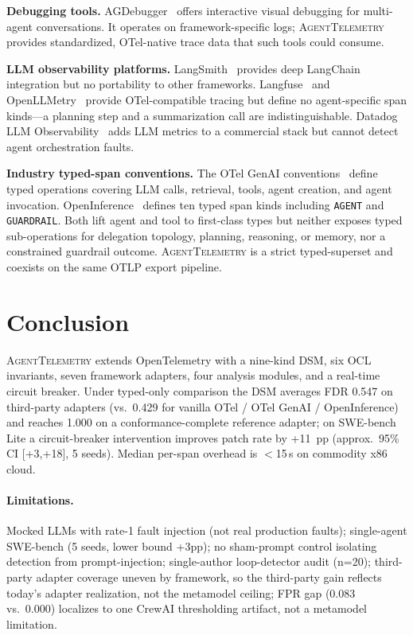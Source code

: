 \documentclass[sigconf,review]{acmart}
\begin{document}
\textbf{Debugging tools.}
AGDebugger~\cite{agdebugger} offers interactive visual debugging for
multi-agent conversations.  It operates on framework-specific logs;
\textsc{AgentTelemetry} provides standardized, OTel-native trace data
that such tools could consume.

\textbf{LLM observability platforms.}
LangSmith~\cite{langsmith} provides deep LangChain integration but
no portability to other frameworks.
Langfuse~\cite{langfuse} and
OpenLLMetry~\cite{openllmetry} provide OTel-compatible tracing but
define no agent-specific span kinds---a planning step and a
summarization call are indistinguishable.
Datadog LLM Observability~\cite{datadog_llm} adds LLM metrics to a
commercial stack but cannot detect agent orchestration faults.

\textbf{Industry typed-span conventions.}
The OTel GenAI conventions~\cite{otelgenai} define typed operations
covering LLM calls, retrieval, tools, agent creation, and agent
invocation.  OpenInference~\cite{openinference} defines ten typed span
kinds including \texttt{AGENT} and \texttt{GUARDRAIL}.  Both lift
agent and tool to first-class types but neither exposes typed
sub-operations for delegation topology, planning, reasoning, or
memory, nor a constrained guardrail outcome.  \textsc{AgentTelemetry}
is a strict typed-superset and coexists on the same OTLP export
pipeline.

\section{Conclusion}
\label{sec:concl}

\textsc{AgentTelemetry} extends OpenTelemetry with a nine-kind DSM,
six OCL invariants, seven framework adapters, four analysis modules,
and a real-time circuit breaker.  Under typed-only comparison the
DSM averages FDR 0.547 on third-party adapters (vs.\ 0.429 for vanilla
OTel / OTel GenAI / OpenInference) and reaches 1.000 on a
conformance-complete reference adapter; on SWE-bench Lite a
circuit-breaker intervention improves patch rate by +11~pp
(approx.\ 95\% CI [+3,+18], 5 seeds).  Median per-span overhead is
$<$15\,\textmu s on commodity x86 cloud.

\paragraph*{Limitations.}
Mocked LLMs with rate-1 fault injection (not real production faults);
single-agent SWE-bench (5 seeds, lower bound +3pp); no sham-prompt
control isolating detection from prompt-injection; single-author
loop-detector audit (n=20); third-party adapter coverage uneven by
framework, so the third-party gain reflects today's adapter realization,
not the metamodel ceiling; FPR gap (0.083 vs.\ 0.000) localizes to one
CrewAI thresholding artifact, not a metamodel limitation.
\end{document}
